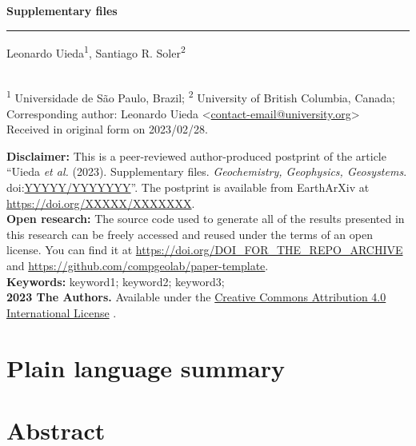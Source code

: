 \documentclass[onecolumn,10pt]{article}
\makeatletter
\newcommand{\Title}{Supplementary files}
\newcommand{\Year}{2023}
\newcommand{\SubmittedOn}{2023/02/28}
\newcommand{\PublishedOn}{2023/02/28}
\newcommand{\AuthorShort}{Uieda \textit{et al.}}
\newcommand{\Authors}{%
  Leonardo Uieda\textsuperscript{1},
  Santiago R. Soler\textsuperscript{2}
}
\newcommand{\Email}{contact-email@university.org}
\newcommand{\Corresponding}{%
  Corresponding author: Leonardo Uieda <\href{mailto:\Email}{\Email}>
}
\newcommand{\Affiliations}{%
  \textsuperscript{1} Universidade de São Paulo, Brazil;
  \textsuperscript{2} University of British Columbia, Canada;
}
\newcommand{\Journal}{Geochemistry, Geophysics, Geosystems}
\newcommand{\JournalDOI}{YYYYY/YYYYYYY}
\newcommand{\PreprintDOI}{XXXXX/XXXXXXX}
\newcommand{\ArchiveDOI}{DOI_FOR_THE_REPO_ARCHIVE}
\newcommand{\GitHubRepository}{compgeolab/paper-template}
\newcommand{\Keywords}{%
  keyword1; keyword2; keyword3;
}
\makeatother
\begin{document}
\thispagestyle{plain}
\begin{FlushLeft}
  \begin{spacing}{2}
    {\LARGE\bfseries \Title}
  \end{spacing}
  {\color{lightgray}\hrule height 1.5pt}
  \vspace{0.3cm}
  \Authors
  \\[0.2cm]
  {\footnotesize \Affiliations}
  \newline
  {\footnotesize \Corresponding}
  \\[0.2cm]
  {\footnotesize
    Received in original form on \SubmittedOn.
  }
\end{FlushLeft}

\begin{summarybox}
  \noindent
  \textbf{Disclaimer:}
  This is a peer-reviewed author-produced postprint of the article
  ``\AuthorShort{} (\Year). \Title. \textit{\Journal}.
  doi:\href{https://doi.org/\JournalDOI}{\JournalDOI}''.
  The postprint is available from EarthArXiv at
  \url{https://doi.org/\PreprintDOI}.
  \\[0.25cm]
  \noindent
  \textbf{Open research:}
  The source code used to generate all of the results presented in this
  research can be freely accessed and reused under the terms of an open license.
  You can find it at \url{https://doi.org/\ArchiveDOI} and
  \url{https://github.com/\GitHubRepository}.
  \\[0.25cm]
  \noindent
  \textbf{Keywords:} \Keywords{}
  \\[0.25cm]
  \noindent
  \textbf{\textcopyright{} \Year{} The Authors.}
  Available under the \href{https://creativecommons.org/licenses/by/4.0/}{Creative Commons Attribution 4.0 International License}
  \faCreativeCommons\faCreativeCommonsBy{}.
\end{summarybox}

\section*{\normalsize Plain language summary}
\begingroup
   \small  \par
\endgroup

\section*{\normalsize Abstract}
\begingroup
   \small  \par
\endgroup





\end{document}
